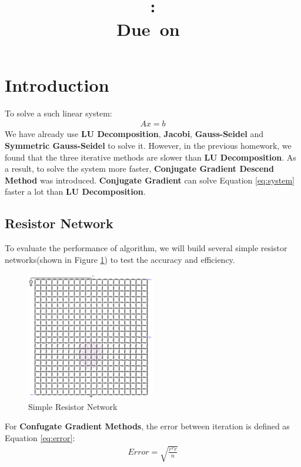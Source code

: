 \documentclass{article}
\title{
    \vspace{2in}
    \textmd{\textbf{\hmwkClass}}\\
    \textmd{\textbf{\hmwkID: \hmwkTitle}} \\
    \normalsize\vspace{0.1in}\small{Due\ on\ \hmwkDueDate}\\
    \vspace{3in}
}
\author{\textbf{\hmwkAuthorName}}
\date{} %
\begin{document}
\maketitle
\newpage

\section{Introduction}
To solve a such linear system:
\begin{gather}
    Ax = b
    \label{eq:system}
\end{gather}
We have already use \textbf{LU Decomposition}, \textbf{Jacobi}, \textbf{Gauss-Seidel} and \textbf{Symmetric Gauss-Seidel} to solve it. However,
in the previous homework, we found that the three iterative methods are slower than \textbf{LU Decomposition}. As a result, to solve the system
more faster, \textbf{Conjugate Gradient Descend Method} was introduced. \textbf{Conjugate Gradient} can solve Equation \ref{eq:system} faster a lot 
than \textbf{LU Decomposition}.

\subsection{Resistor Network}
To evaluate the performance of algorithm, we will build several simple resistor networks(shown in Figure \ref{fig:network}) to test the accuracy 
and efficiency.
\begin{figure}[H]
    \centering
    \includegraphics[width=0.5\textwidth]{src/network.png}
    \caption{Simple Resistor Network}
    \label{fig:network}
\end{figure}
For \textbf{Confugate Gradient Methods}, the error between iteration is defined as Equation \ref{eq:error}:
\begin{gather}
    Error = \sqrt{\frac{r^Tr}{n}}
    \label{eq:error}
\end{gather}
\newpage
\end{document}
